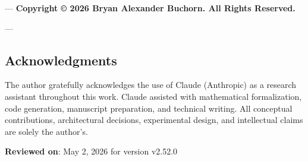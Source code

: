---
\textbf{Copyright © 2026 Bryan Alexander Buchorn. All Rights Reserved.}

---
\subsection{Acknow\-ledgments}

The author gratefully ackno\-wledges the use of Claude (Anthropic) as a research assistant throughout this work. Claude assisted with mathe\-matical forma\-lization, code generation, manuscript preparation, and technical writing. All conceptual contr\-ibutions, archi\-tectural decisions, exper\-imental design, and intel\-lectual claims are solely the author's.

\textbf{Reviewed on}: May 2, 2026 for version v2.52.0
